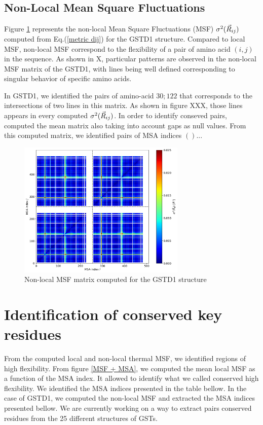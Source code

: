 \subsection{Non-Local Mean Square Fluctuations}

Figure \ref{Non-local MSF GSTD1} represents the non-local Mean Square Fluctuations (MSF) $\sigma^2 (\vec{R}_{ij})$ computed from Eq.(\ref{metric dij}) for the GSTD1 structure.  Compared to local MSF, non-local MSF correspond to the flexibility of a pair of amino acid $(i,j)$ in the sequence. As shown in X, particular patterns are observed in the non-local MSF matrix of the GSTD1, with lines being well defined corresponding to singular behavior of specific amino acids.

In GSTD1, we identified the pairs of amino-acid $30;122$ that corresponds to the intersections of two lines in this matrix. As shown in figure XXX, those lines appears in every computed $\sigma^2(\vec{R}_{ij})$. In order to identify conseved pairs, computed the mean matrix also taking into account gaps as null values. From this computed matrix, we identified pairs of MSA indices $()$... 

\begin{figure}
	\label{Non-local MSF GSTD1}
	\includegraphics[width = 8cm]{figures/ANM-COM+MSA_GSTD1_APO_non-local_MSF}
	\caption{Non-local MSF matrix computed for the GSTD1 structure}
\end{figure}

\section{Identification of conserved key residues}

From the computed local and non-local thermal MSF, we identified regions of high flexibility. From figure \ref{MSF + MSA}, we computed the mean local MSF as a function of the MSA index. It allowed to identify what we called conserved high flexibility. We identified the MSA indices presented in the table bellow. In the case of GSTD1, we computed the non-local MSF and extracted the MSA indices presented bellow. We are currently working on a way to extract pairs conserved residues from the 25 different structures of GSTs.

